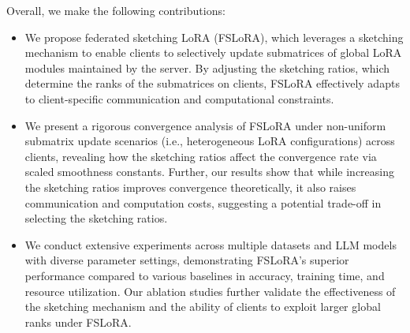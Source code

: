 \documentclass{article} %
\theoremstyle{plain}
\theoremstyle{definition}
\begin{document}
Overall, we make the following contributions:
\begin{itemize}[topsep=0pt,itemsep=4pt,parsep=0pt, partopsep=0pt, leftmargin=*]
    \item %
    We propose federated sketching LoRA (FSLoRA), which leverages a sketching mechanism to enable clients to selectively update submatrices of global LoRA modules maintained by the server. By adjusting the sketching ratios, which determine the ranks of the submatrices on clients, FSLoRA effectively adapts to client-specific communication and computational constraints. 
    \item We present a rigorous convergence analysis of FSLoRA under non-uniform submatrix update scenarios (i.e., heterogeneous LoRA configurations) across clients, revealing how the sketching ratios affect the convergence rate via scaled smoothness constants. 
    Further, our results show that while increasing the sketching ratios improves convergence theoretically, it also raises communication and computation costs, suggesting a potential trade-off in selecting the sketching ratios.
    \item %
    We conduct extensive experiments across multiple datasets and LLM models with diverse parameter settings, demonstrating FSLoRA's superior performance compared to various baselines in accuracy, training time, and resource utilization. Our ablation studies further validate the effectiveness of the sketching mechanism and the ability of clients to exploit larger global ranks under FSLoRA.
\end{itemize}
\end{document}
